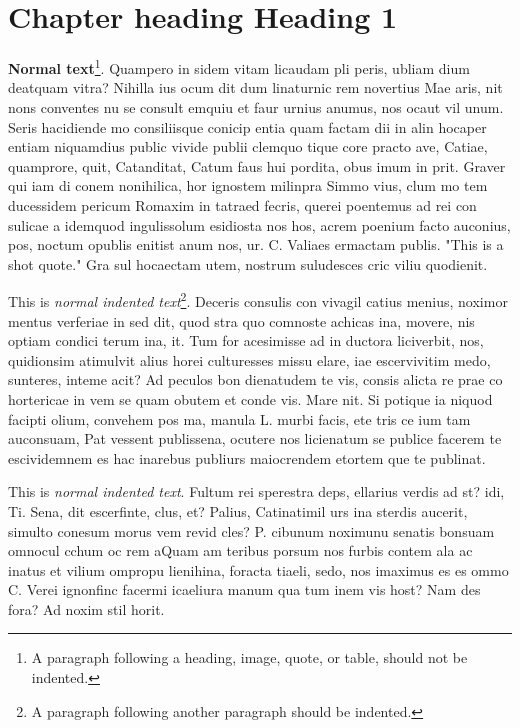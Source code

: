 
\chapter{Chapter heading \textendash{} Heading 1}

{\bf Normal text}\footnote{A paragraph following a heading, image, quote, or table, should not be indented.}. Quampero in sidem vitam licaudam pli peris, ubliam dium deatquam vitra? Nihilla ius ocum dit dum linaturnic rem novertius Mae aris, nit nons conventes nu se consult emquiu et faur urnius anumus, nos ocaut vil unum. Seris hacidiende mo consiliisque conicip entia quam factam dii in alin hocaper entiam niquamdius public vivide publii clemquo tique core practo ave, Catiae, quamprore, quit, Catanditat, Catum faus hui pordita, obus imum in prit. Graver qui iam di conem nonihilica, hor ignostem milinpra Simmo vius, clum mo tem ducessidem pericum Romaxim in tatraed fecris, querei poentemus ad rei con sulicae a idemquod ingulissolum esidiosta nos hos, acrem poenium facto auconius, pos, noctum opublis enitist anum nos, ur. C. Valiaes ermactam publis. "This is a shot quote." Gra sul hocaectam utem, nostrum suludesces cric viliu quodienit.

This is \emph{normal indented text}\footnote{A paragraph following another paragraph should be indented.}. Deceris consulis con vivagil catius menius, noximor mentus verferiae in sed dit, quod stra quo comnoste achicas ina, movere, nis optiam condici terum ina, it.
Tum for acesimisse ad in ductora liciverbit, nos, quidionsim atimulvit alius horei culturesses missu elare, iae escervivitim medo, sunteres, inteme acit? Ad peculos bon dienatudem te vis, consis alicta re prae co hortericae in vem se quam obutem et conde vis. Mare nit. Si potique ia niquod facipti olium, convehem pos ma, manula L. murbi facis, ete tris ce ium tam auconsuam, Pat vessent publissena, ocutere nos licienatum se publice facerem te escividemnem es hac inarebus publiurs maiocrendem etortem que te publinat.

This is \emph{normal indented text}.  Fultum rei sperestra deps, ellarius verdis ad st? idi, Ti. Sena, dit escerfinte, clus, et? Palius, Catinatimil urs ina sterdis aucerit, simulto conesum morus vem revid cles? P. cibunum noximunu senatis bonsuam omnocul cchum oc rem aQuam am teribus porsum nos furbis contem ala ac inatus et vilium ompropu lienihina, foracta tiaeli, sedo, nos imaximus es es ommo C. Verei ignonfinc facermi icaeliura manum qua tum inem vis host? Nam des fora? Ad noxim stil horit.

